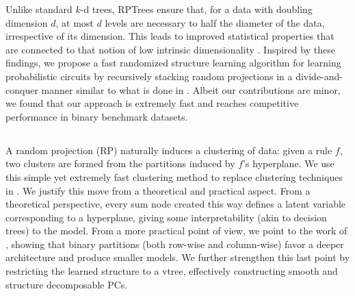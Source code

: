 Unlike standard $k$-d trees, RPTrees ensure that, for a data with doubling dimension $d$, at most
$d$ levels are necessary to half the diameter of the data, irrespective of its dimension. This
leads to improved statistical properties that are connected to that notion of low intrinsic
dimensionality \citep{dasgupta08b,dhesi10}. Inspired by these findings, we propose a fast
randomized structure learning algorithm for learning probabilistic circuits by recursively stacking
random projections in a divide-and-conquer manner similar to what is done in .
Albeit our contributions are minor, we found that our approach is extremely fast and reaches
competitive performance in binary benchmark datasets.

\subsection{}

A random projection (RP) naturally induces a clustering of data: given a rule $f$, two clusters are
formed from the partitions induced by $f$'s hyperplane. We use this simple yet extremely fast
clustering method to replace clustering techniques in . We justify this move
from a theoretical and practical aspect. From a theoretical perspective, every sum node created
this way defines a latent variable corresponding to a hyperplane, giving some interpretability
(akin to decision trees) to the model. From a more practical point of view, we point to the work
of \citet{vergari15}, showing that binary partitions (both row-wise and column-wise) favor a deeper
architecture and produce smaller models. We further strengthen this last point by restricting the
learned structure to a vtree, effectively constructing smooth and structure decomposable PCs.

